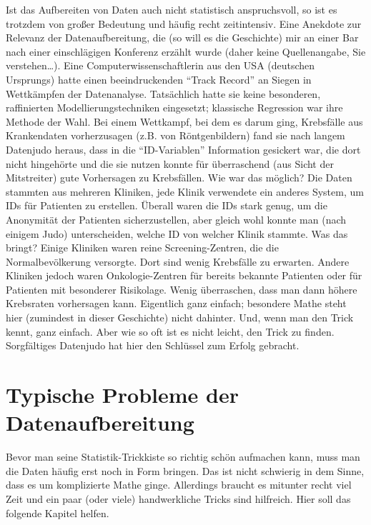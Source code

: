 \documentclass[12pt,ngerman,]{book}
\theoremstyle{definition}
\theoremstyle{definition}
\theoremstyle{remark}
\begin{document}
Ist das Aufbereiten von Daten auch nicht statistisch anspruchsvoll, so
ist es trotzdem von großer Bedeutung und häufig recht zeitintensiv. Eine
Anekdote zur Relevanz der Datenaufbereitung, die (so will es die
Geschichte) mir an einer Bar nach einer einschlägigen Konferenz erzählt
wurde (daher keine Quellenangabe, Sie verstehen\ldots{}). Eine
Computerwissenschaftlerin aus den USA (deutschen Ursprungs) hatte einen
beeindruckenden ``Track Record'' an Siegen in Wettkämpfen der
Datenanalyse. Tatsächlich hatte sie keine besonderen, raffinierten
Modellierungstechniken eingesetzt; klassische Regression war ihre
Methode der Wahl. Bei einem Wettkampf, bei dem es darum ging, Krebsfälle
aus Krankendaten vorherzusagen (z.B. von Röntgenbildern) fand sie nach
langem Datenjudo heraus, dass in die ``ID-Variablen'' Information
gesickert war, die dort nicht hingehörte und die sie nutzen konnte für
überraschend (aus Sicht der Mitstreiter) gute Vorhersagen zu
Krebsfällen. Wie war das möglich? Die Daten stammten aus mehreren
Kliniken, jede Klinik verwendete ein anderes System, um IDs für
Patienten zu erstellen. Überall waren die IDs stark genug, um die
Anonymität der Patienten sicherzustellen, aber gleich wohl konnte man
(nach einigem Judo) unterscheiden, welche ID von welcher Klinik stammte.
Was das bringt? Einige Kliniken waren reine Screening-Zentren, die die
Normalbevölkerung versorgte. Dort sind wenig Krebsfälle zu erwarten.
Andere Kliniken jedoch waren Onkologie-Zentren für bereits bekannte
Patienten oder für Patienten mit besonderer Risikolage. Wenig
überraschen, dass man dann höhere Krebsraten vorhersagen kann.
Eigentlich ganz einfach; besondere Mathe steht hier (zumindest in dieser
Geschichte) nicht dahinter. Und, wenn man den Trick kennt, ganz einfach.
Aber wie so oft ist es nicht leicht, den Trick zu finden. Sorgfältiges
Datenjudo hat hier den Schlüssel zum Erfolg gebracht.

\section{Typische Probleme der
Datenaufbereitung}\label{typische-probleme-der-datenaufbereitung}

Bevor man seine Statistik-Trickkiste so richtig schön aufmachen kann,
muss man die Daten häufig erst noch in Form bringen. Das ist nicht
schwierig in dem Sinne, dass es um komplizierte Mathe ginge. Allerdings
braucht es mitunter recht viel Zeit und ein paar (oder viele)
handwerkliche Tricks sind hilfreich. Hier soll das folgende Kapitel
helfen.
\end{document}
